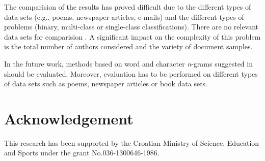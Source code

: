\documentclass{llncs}
\begin{document}
The comparision of the results has proved difficult due to the different types of
data sets (e.g., poems, newspaper articles, e-mails) and the different types of
problems (binary, multi-class or single-class classifications). There are no
relevant data sets for comparision \cite{zhao2005effective}. A significant impact
on the complexity of this problem is the total number of authors considered and
the variety of document samples.

In the future work, methods based on word and character \emph{n}-grams suggested
in \cite{keselj2003n,peng2003language,coyotl2006authorship} should be
evaluated. Moreover, evaluation has to be performed on different types of data sets
such as poems, newspaper articles or book data sets.

\section*{Acknowledgement}
This research has been supported by the Croatian Ministry of Science, Education
and Sports under the grant No.036-1300646-1986.



\end{document}
